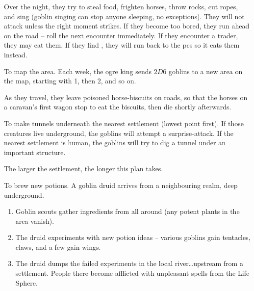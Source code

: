 \begin{multicols}{2}
\begin{dlist}
  Over the night, they try to steal food, frighten horses, throw rocks, cut ropes, and sing (goblin singing can stop anyone sleeping, no exceptions).
  They will not attack unless the right moment strikes.
  If they become too bored, they run ahead on the road -- roll the next encounter immediately.
  If they encounter a trader, they may eat them.
  If they find , they will run back to the \glspl{pc} so it eats them instead.
  \item
  To map the area.
  Each week, the \gls{ogre} king sends $2D6$ goblins to a new area on the map, starting with 1, then 2, and so on.

  As they travel, they leave poisoned horse-biscuits on roads, so that the horses on a caravan's first wagon stop to eat the biscuits, then die shortly afterwards.
  \item
  To make tunnels underneath the nearest settlement (lowest point first).
  If those creatures live underground, the goblins will attempt a surprise-attack.
  If the nearest settlement is human, the goblins will try to dig a tunnel under an important structure.

  The larger the settlement, the longer this plan takes.
  \item
  To brew new potions.
  A goblin druid arrives from a neighbouring realm, deep underground.

  \null
  \begin{enumerate}%
    \item
    Goblin scouts gather \glspl{ingredient} from all around (any potent plants in the area vanish).
    \item
    The druid experiments with new potion ideas -- various goblins gain tentacles, claws, and a few gain wings.
    \item
    The druid dumps the failed experiments in the local river\ldots upstream from a settlement.
    People there become afflicted with unpleasant spells from the Life Sphere.
  \end{enumerate}
\end{dlist}

\end{multicols}

